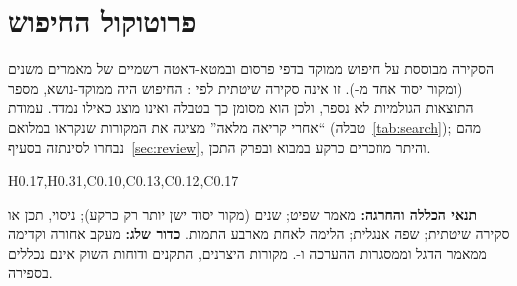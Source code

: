 \section{פרוטוקול החיפוש}\label{sec:protocol}
הסקירה מבוססת על חיפוש ממוקד בדפי פרסום ובמטא-דאטה רשמיים של מאמרים משנים  (ומקור יסוד אחד מ-).
זו אינה סקירה שיטתית לפי : החיפוש היה ממוקד-נושא, מספר התוצאות הגולמיות לא נספר, ולכן הוא מסומן כך בטבלה
ואינו מוצג כאילו נמדד. עמודת “אחרי קריאה מלאה” מציגה את המקורות שנקראו במלואם (טבלה~\ref{tab:search}); מהם נבחרו 
לסינתזה בסעיף~\ref{sec:review}, והיתר מוזכרים כרקע במבוא ובפרק התכן.
\begin{table}[!htbp]
\centering
\caption{פרוטוקול החיפוש: מקורות שנקראו במלואם לפי מאגר}\label{tab:search}
\begin{pctable}{H{0.17},H{0.31},C{0.10},C{0.13},C{0.12},C{0.17}}
  \midrule
\end{pctable}
\end{table}
\textbf{תנאי הכללה והחרגה:} מאמר שפיט; שנים  (מקור יסוד ישן יותר רק כרקע); ניסוי, תכן או סקירה שיטתית;
שפה אנגלית; הלימה לאחת מארבע התמות. \textbf{כדור שלג:} מעקב אחורה וקדימה ממאמר הדגל וממסגרות ההערכה  ו-.
מקורות היצרנים, התקנים ודוחות השוק אינם נכללים בספירה.

